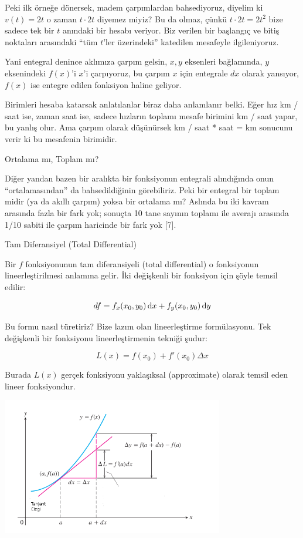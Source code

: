 \documentclass[12pt,fleqn]{article}\usepackage{../../common}
\begin{document}
Peki ilk örneğe dönersek, madem çarpımlardan bahsediyoruz, diyelim ki
$v(t) = 2t$ o zaman $t \cdot 2t$ diyemez miyiz? Bu da olmaz, çünkü $t\cdot 2t = 2t^2$ 
bize sadece tek bir $t$ anındaki bir hesabı veriyor. Biz verilen bir 
başlangıç ve bitiş noktaları arasındaki ``tüm $t$'ler üzerindeki'' 
katedilen mesafeyle ilgileniyoruz.  

Yani entegral denince aklımıza çarpım gelsin, $x,y$ eksenleri bağlamında,
$y$ eksenindeki $f(x)$'i $x$'i çarpıyoruz, bu çarpım $x$ için entegrale
$dx$ olarak yansıyor, $f(x)$ ise entegre edilen fonksiyon haline geliyor. 

Birimleri hesaba katarsak anlatılanlar biraz daha anlamlanır belki. Eğer
hız km / saat ise, zaman saat ise, sadece hızların toplamı mesafe birimini
km / saat yapar, bu yanlış olur. Ama çarpım olarak düşünürsek km / saat *
saat = km sonucunu verir ki bu mesafenin birimidir. 

Ortalama mı, Toplam mı?

Diğer yandan bazen bir aralıkta bir fonksiyonun entegrali alındığında onun
``ortalamasından'' da bahsedildiğinin görebiliriz. Peki bir entegral bir
toplam midir (ya da akıllı çarpım) yoksa bir ortalama mı? Aslında bu iki
kavram arasında fazla bir fark yok; sonuçta 10 tane sayının toplamı ile
averajı arasında 1/10 sabiti ile çarpım haricinde bir fark yok [7]. 

Tam Diferansiyel (Total Differential)

Bir $f$ fonksiyonunun tam diferansiyeli (total differential) o
fonksiyonun lineerleştirilmesi anlamına gelir. İki değişkenli bir
fonksiyon için şöyle temsil edilir:

$$ df = f_x(x_0, y_0)\,\mathrm{d} x + f_y(x_0,y_0)\,\mathrm{d} y  $$

Bu formu nasıl türetiriz? Bize lazım olan lineerleştirme formülasyonu. Tek
değişkenli bir fonksiyonu lineerleştirmenin tekniği şudur:

$$ L(x) = f(x_0) + f'(x_0) \Delta x  $$

Burada $L(x)$ gerçek fonksiyonu yaklaşıksal (approximate) olarak temsil eden
lineer fonksiyondur. 

\includegraphics[height=6cm]{ode_mattuck_95_total_06.png}
\end{document}

